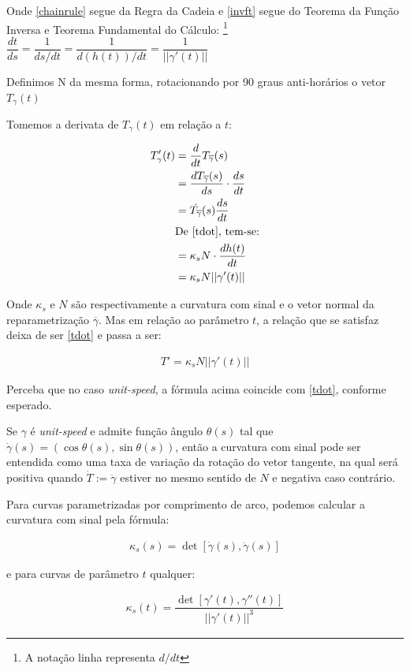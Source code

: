 \documentclass[12pt,letterpaper]{article}
\begin{document}
	Onde \ref{chainrule} segue da Regra da Cadeia e \ref{invft} segue do Teorema da Função Inversa e Teorema Fundamental do Cálculo: \footnote{A notação linha representa $d/dt$}		$\dfrac{dt}{ds}=\dfrac{1}{ds/dt}=\dfrac{1}{d(h(t))/dt}=\dfrac{1}{||\gamma'(t)||}
		$
	
	Definimos N da mesma forma, rotacionando por 90 graus anti-horários o vetor $T_{\gamma}(t)$
	
	Tomemos a derivata de $T_\gamma(t)$ em relação a $t$:
	
	\begin{align*}
		T'_\gamma(t)&=\dfrac{d}{dt}T_{\overline{\gamma}}(s)\\
		&=\dfrac{dT_{\overline{\gamma}}(s)}{ds}\cdot\dfrac{ds}{dt}\\
		&=\dot{T_{\overline{\gamma}}}(s)\dfrac{ds}{dt}\\
		&\text{De \ref{tdot}, tem-se:}\\
		&=\kappa_sN\cdot\dfrac{dh(t)}{dt}\\
		&=\kappa_sN||\gamma'(t)||
	\end{align*}
	
	Onde $\kappa_s$ e $N$ são respectivamente a curvatura com sinal e o vetor normal da reparametrização $\overline{\gamma}$. Mas em relação ao parâmetro $t$, a relação que se satisfaz deixa de ser \ref{tdot} e passa a ser:
	
	\begin{align*}
		T'=\kappa_sN||\gamma'(t)||
	\end{align*}
	
	Perceba que no caso \textit{unit-speed}, a fórmula acima coincide com \ref{tdot}, conforme esperado.
	
	Se $\gamma$ é \textit{unit-speed} e admite função ângulo $\theta(s)$ tal que $\dot{\gamma}(s)=(\cos\theta(s),\sin\theta(s))$, então a curvatura com sinal pode ser entendida como uma taxa de variação da rotação do vetor tangente, na qual será positiva quando $\dot{T}:=\ddot{\gamma}$ estiver no mesmo sentido de $N$ e negativa caso contrário.
	
	Para curvas parametrizadas por comprimento de arco, podemos calcular a curvatura com sinal pela fórmula:
	
	\begin{align*}
		\kappa_s(s)=\det[\dot{\gamma}(s),\ddot{\gamma}(s)]
	\end{align*}

	e para curvas de parâmetro $t$ qualquer:
	
	\begin{align*}
	\kappa_s(t)=\dfrac{\det[\gamma'(t),\gamma''(t)]}{||\gamma'(t)||^3}	
\end{align*}
\end{document}
